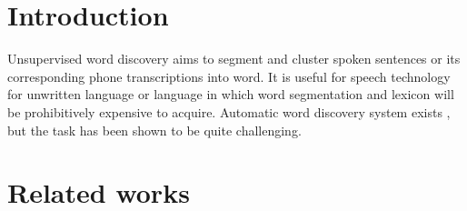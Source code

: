 \documentclass[journal]{IEEEtran}
\begin{document}
%
\IEEEpeerreviewmaketitle



\section{Introduction}
Unsupervised word discovery aims to segment and cluster spoken sentences or its corresponding phone transcriptions into word. It is useful for speech technology for unwritten language or language in which word segmentation and lexicon will be prohibitively expensive to acquire. Automatic word discovery system exists \cite{Bharadwaj2013, Rasanen2015, Kamper2017}, but the task has been shown to be quite challenging.     
% 
% 
% 
% 



 
\section{Related works}
\end{document}
